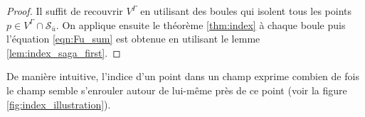 \begin{proof}
Il suffit de recouvrir $V^\Gamma$ en utilisant des boules qui isolent tous les points $p\in V^\Gamma\cap\mathcal{S}_{\bar{u}}$. On applique ensuite le théorème \ref{thm:index} à chaque boule puis l'équation \eqref{eqn:Fu_sum} est obtenue en utilisant le lemme \ref{lem:index_saga_first}.
\end{proof}

De manière intuitive, l'indice d'un point dans un champ exprime combien de fois le champ semble s'enrouler autour de lui-même près de ce point (voir la figure \ref{fig:index_illustration}).

